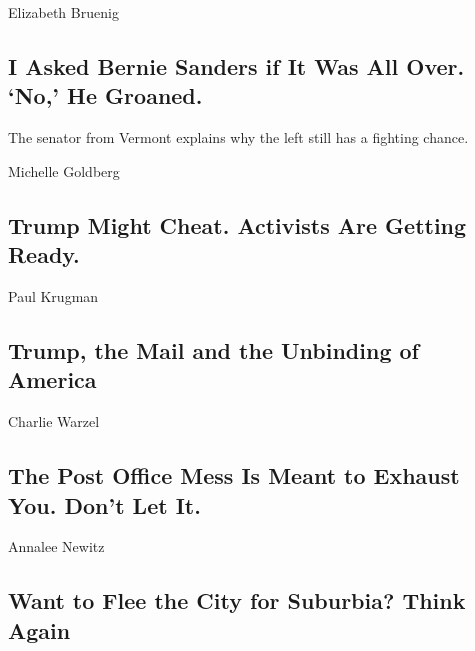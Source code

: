 \href{/2020/08/17/opinion/bernie-sanders-joe-biden.html}{}

Elizabeth Bruenig

\hypertarget{i-asked-bernie-sanders-if-it-was-all-over-no-he-groaned}{%
\subsection{I Asked Bernie Sanders if It Was All Over. `No,' He
Groaned.}\label{i-asked-bernie-sanders-if-it-was-all-over-no-he-groaned}}

The senator from Vermont explains why the left still has a fighting
chance.

\href{/2020/08/17/opinion/bernie-sanders-joe-biden.html}{}

\href{/2020/08/17/opinion/trump-contested-election-protests.html}{}

Michelle Goldberg

\hypertarget{trump-might-cheat-activists-are-getting-ready}{%
\subsection{Trump Might Cheat. Activists Are Getting
Ready.}\label{trump-might-cheat-activists-are-getting-ready}}

\href{/2020/08/17/opinion/trump-us-mail.html}{}

Paul Krugman

\hypertarget{trump-the-mail-and-the-unbinding-of-america}{%
\subsection{Trump, the Mail and the Unbinding of
America}\label{trump-the-mail-and-the-unbinding-of-america}}

\href{/2020/08/17/opinion/trump-post-office-election.html}{}

Charlie Warzel

\hypertarget{the-post-office-mess-is-meant-to-exhaust-you-dont-let-it}{%
\subsection{The Post Office Mess Is Meant to Exhaust You. Don't Let
It.}\label{the-post-office-mess-is-meant-to-exhaust-you-dont-let-it}}

\href{/2020/08/17/opinion/coronavirus-cities-suburbs.html}{}

Annalee Newitz

\hypertarget{want-to-flee-the-city-for-suburbia-think-again}{%
\subsection{Want to Flee the City for Suburbia? Think
Again}\label{want-to-flee-the-city-for-suburbia-think-again}}

